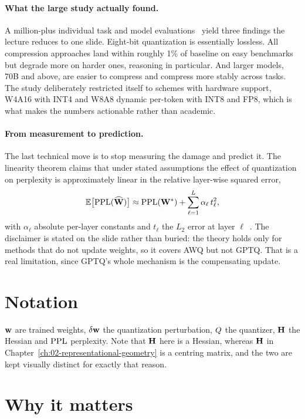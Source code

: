 \paragraph{What the large study actually found.} A million-plus individual task and model
evaluations~\citep{kurtic2025} yield three findings the lecture reduces to one slide. Eight-bit
quantization is essentially lossless. All compression approaches land within roughly 1\% of
baseline on easy benchmarks but degrade more on harder ones, reasoning in particular. And larger
models, 70B and above, are easier to compress and compress more stably across tasks. The study
deliberately restricted itself to schemes with hardware support, W4A16 with INT4 and W8A8 dynamic
per-token with INT8 and FP8, which is what makes the numbers actionable rather than academic.

\paragraph{From measurement to prediction.} The last technical move is to stop measuring the damage
and predict it. The linearity theorem claims that under stated assumptions the effect of
quantization on perplexity is approximately linear in the relative layer-wise squared error,
\[
  \operatorname*{\mathbb{E}}\bigl[\mathrm{PPL}(\widehat{\mathbf{W}})\bigr] \approx \mathrm{PPL}(\mathbf{W}^{*})
    + \sum_{\ell=1}^{L} \alpha_\ell\, t_\ell^{2},
\]
\noindent with $\alpha_\ell$ absolute per-layer constants and $t_\ell$ the $L_2$ error at layer
$\ell$~\citep{malinovskii2025}. The disclaimer is stated on the slide rather than buried: the
theory holds only for methods that do not update weights, so it covers AWQ but not GPTQ. That is a
real limitation, since GPTQ's whole mechanism is the compensating update.

\section*{Notation}

$\mathbf{w}$ are trained weights, $\delta\mathbf{w}$ the quantization perturbation, $Q$ the quantizer, $\mathbf{H}$
the Hessian and $\mathrm{PPL}$ perplexity. Note that $\mathbf{H}$ here is a Hessian, whereas $\mathbf{H}$ in
Chapter~\ref{ch:02-representational-geometry} is a centring matrix, and the two are kept visually
distinct for exactly that reason.

\section*{Why it matters}


